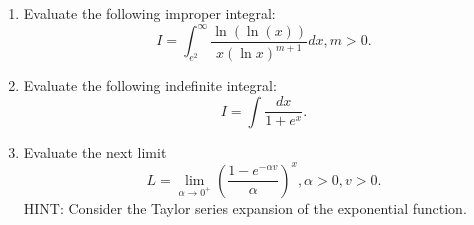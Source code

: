 \documentclass[12pt]{article}
\begin{document}
\begin{enumerate}

\item Evaluate the following improper integral: 
      \[
      I = \int_{e^2}^{\infty} \frac{\ln(\ln(x))}{x (\ln x)^{m+1}} dx, m > 0. 
      \]
\item Evaluate the following indefinite integral: 
      \[
      I = \int \frac{dx}{1+e^x}. 
      \]
\item Evaluate the next limit 
      \[
      L = \lim_{\alpha \rightarrow 0^{+}} \left( 
          \frac{1-e^{-\alpha v}}{\alpha}\right)^x, 
          \alpha > 0, v > 0. 
      \]
      HINT: Consider the Taylor series expansion of the exponential function. 

\end{enumerate}
\end{document}
